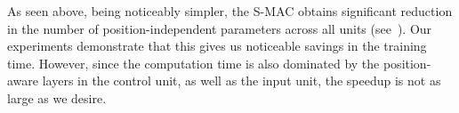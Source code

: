 As seen above, being noticeably simpler, the S-MAC obtains significant reduction in the number of position-independent parameters across all units (see~).
Our experiments demonstrate that this gives us noticeable savings in the training time. However, since the computation time is also dominated by the position-aware layers in the control unit, as well as the input unit, the speedup is not as large as we desire.